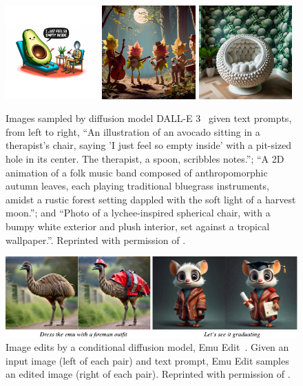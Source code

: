 \begin{figure}[t]
    \centering
    \includegraphics[width=0.32\textwidth]{figs/thesis/dalle3/1.png}
    \hfill
    \includegraphics[width=0.32\textwidth]{figs/thesis/dalle3/2.png}
    \hfill
    \includegraphics[width=0.32\textwidth]{figs/thesis/dalle3/4.png}
    \caption{Images sampled by diffusion model DALL-E 3~\citep{betker2023improving} given text prompts, from left to right, ``An illustration of an avocado sitting in a therapist's chair, saying 'I just feel so empty inside' with a pit-sized hole in its center. The therapist, a spoon, scribbles notes.''; ``A 2D animation of a folk music band composed of anthropomorphic autumn leaves, each playing traditional bluegrass instruments, amidst a rustic forest setting dappled with the soft light of a harvest moon.''; and ``Photo of a lychee-inspired spherical chair, with a bumpy white exterior and plush interior, set against a tropical wallpaper.''. Reprinted with permission of \citeauthor{betker2023improving}.}
    \label{fig:dalle-3-samples}
    \centering
    \includegraphics{figs/thesis/emu_edit_examples.pdf}
    \caption{Image edits by a conditional diffusion model, Emu Edit~\citep{sheynin2023emu}. Given an input image (left of each pair) and text prompt, Emu Edit samples an edited image (right of each pair). Reprinted with permission of \citeauthor{sheynin2023emu}.}
    \label{fig:emu-edit-samples}
\end{figure}

